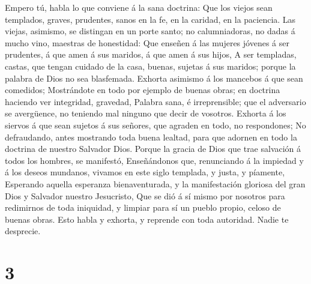  Empero tú, habla lo que conviene á la sana doctrina:
 Que los viejos sean templados, graves, prudentes, sanos en
la fe, en la caridad, en la paciencia.  Las viejas,
asimismo, se distingan en un porte santo; no calumniadoras, no dadas á
mucho vino, maestras de honestidad:  Que enseñen á las
mujeres jóvenes á ser prudentes, á que amen á sus maridos, á que amen á
sus hijos,  A ser templadas, castas, que tengan cuidado de
la casa, buenas, sujetas á sus maridos; porque la palabra de Dios no sea
blasfemada.  Exhorta asimismo á los mancebos á que sean
comedidos;  Mostrándote en todo por ejemplo de buenas obras;
en doctrina haciendo ver integridad, gravedad,  Palabra
sana, é irreprensible; que el adversario se avergüence, no teniendo mal
ninguno que decir de vosotros.  Exhorta á los siervos á que
sean sujetos á sus señores, que agraden en todo, no respondones;
 No defraudando, antes mostrando toda buena lealtad, para
que adornen en todo la doctrina de nuestro Salvador Dios. 
Porque la gracia de Dios que trae salvación á todos los hombres, se
manifestó,  Enseñándonos que, renunciando á la impiedad y á
los deseos mundanos, vivamos en este siglo templada, y justa, y
píamente,  Esperando aquella esperanza bienaventurada, y la
manifestación gloriosa del gran Dios y Salvador nuestro Jesucristo,
 Que se dió á sí mismo por nosotros para redimirnos de toda
iniquidad, y limpiar para sí un pueblo propio, celoso de buenas obras.
 Esto habla y exhorta, y reprende con toda autoridad. Nadie
te desprecie.

\hypertarget{section-2}{%
\section{3}\label{section-2}}

